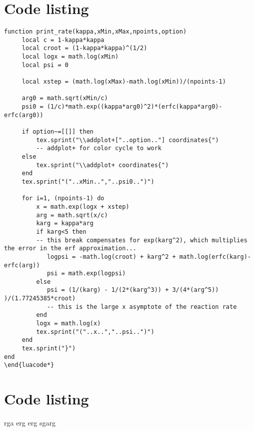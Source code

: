 

\chapter{Code listing}

%
%

\begin{lstlisting}
function print_rate(kappa,xMin,xMax,npoints,option)
     local c = 1-kappa*kappa
     local croot = (1-kappa*kappa)^(1/2)
     local logx = math.log(xMin)
     local psi = 0
     
     local xstep = (math.log(xMax)-math.log(xMin))/(npoints-1)
     
     arg0 = math.sqrt(xMin/c)
     psi0 = (1/c)*math.exp((kappa*arg0)^2)*(erfc(kappa*arg0)-erfc(arg0))
     
     if option~=[[]] then
  		 tex.sprint("\\addplot+["..option.."] coordinates{") 
  		 -- addplot+ for color cycle to work
     else
  		 tex.sprint("\\addplot+ coordinates{")
     end
     tex.sprint("("..xMin..","..psi0..")")
     
     for i=1, (npoints-1) do
  		 x = math.exp(logx + xstep)
  		 arg = math.sqrt(x/c)
  		 karg = kappa*arg
  		 if karg<5 then 
		 -- this break compensates for exp(karg^2), which multiplies the error in the erf approximation...
  		    logpsi = -math.log(croot) + karg^2 + math.log(erfc(karg)-erfc(arg))
  		    psi = math.exp(logpsi)
  		 else
  		    psi = (1/(karg) - 1/(2*(karg^3)) + 3/(4*(arg^5)) )/(1.77245385*croot)
  		    -- this is the large x asymptote of the reaction rate
  		 end
  		 logx = math.log(x)
  		 tex.sprint("("..x..","..psi..")")
     end
     tex.sprint("}")
end
\end{luacode*}
\end{lstlisting}

\chapter{Code listing}
rga erg erg sgarg